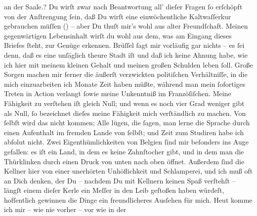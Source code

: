 \begin{ledgroupsized}[t]{13cm}
{{{                     an der Saale.}}}\label{K_L02663-55h}? Du wirſt zwar nach Beantwortung all’ dieſer Fragen
               ſo erſchöpft von der Anſtrengung ſein, daß Du wirſt eine einwöchentliche
               Kaltwaſſerkur gebrauchen müſſen (\label{K_L02663-4v}\label{K_L02663-4h}) – aber Du thuſt mir’s
               wohl aus alter Freundſchaft.\pend
           \pstart
           Meinen gegenwärtigen Lebensinhalt wirſt du wohl aus dem, was am Eingang dieses
               Briefes ſteht, zur Genüge erkennen. Brüſſel ſagt
               mir vorläufig gar nichts – es ſei denn, daß es eine unſäglich theure Stadt iſt und daß ich keine Ahnung habe, wie
               ich hier mit meinem kleinen Gehalt und meinen großen Schulden leben ſoll. Große
               Sorgen machen mir ferner die äußerſt verzwickten politiſchen Verhältniſſe, in die
               mich einzuarbeiten ich Monate Zeit haben müßte, während man {\pb}mein ſofortiges Treten in Action verlangt ſowie
               meine Unkenntniß im Franzöſiſchen. Meine Fähigkeit zu verſtehen iſt gleich Null; und
               wenn es noch vier Grad weniger gibt als Null, ſo bezeichnet dieſes meine Fähigkeit
               mich verſtändlich zu machen. Von ſelbſt wird das nicht kommen; Alle lügen, die ſagen,
               man lerne die Sprache durch einen Aufenthalt im fremden Lande von ſelbſt; und Zeit
               zum Studiren habe ich abſolut nicht. Zwei Eigenthümlichkeiten von Belgien ſind mir beſonders ins Auge gefallen: es iſt ein Land, in dem es keine
               Zahnſtocher gibt, und in dem man die Thürklinken durch einen Druck von unten nach
               oben öffnet. Außerdem ſind die Kellner hier von einer unerhörten Unhöflichkeit und
               Schlamperei, und ich muß oft an Dich denken, der Du – nachdem Du mit Kellnern keinen
               Spaß verſtehſt – längſt einem dieſer Kerle ein Meſſer in den Leib geſtoßen haben
               würdeſt, hofſentlich gewinnen die Dinge ein freundlicheres Ausſehen für mich. Heut komme ich mir – wie nie vorher – vor wie in der

\end{ledgroupsized}
